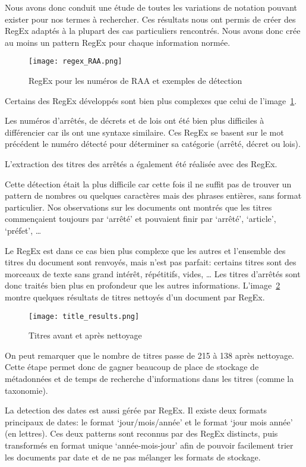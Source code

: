 Nous avons donc conduit une étude de toutes les variations de notation pouvant exister pour nos termes à rechercher.
Ces résultats nous ont permis de créer des RegEx adaptés à la plupart des cas particuliers rencontrés.
Nous avons donc crée au moins un pattern RegEx pour chaque information normée.

\begin{figure}[h!]
  \centering
  \texttt{[image: regex\_RAA.png]}
	\caption[]{RegEx pour les numéros de RAA et exemples de détection}
	\label{fig:regexRAA}
\end{figure}

Certains des RegEx développés sont bien plus complexes que celui de l'image~\ref{fig:regexRAA}.

Les numéros d'arrêtés, de décrets et de lois ont été bien plus difficiles à différencier car ils ont une syntaxe similaire.
Ces RegEx se basent sur le mot précédent le numéro détecté pour déterminer sa catégorie (arrêté, décret ou lois).


L'extraction des titres des arrêtés a également été réalisée avec des RegEx.

Cette détection était la plus difficile car cette fois il ne suffit pas de trouver un pattern de nombres ou quelques caractères mais des phrases entières, sans format particulier.
Nos observations sur les documents ont montrés que les titres commençaient toujours par `arrêté' et pouvaient finir par `arrêté', `article', `préfet', \ldots

Le RegEx est dans ce cas bien plus complexe que les autres et l'ensemble des titres du document sont renvoyés, mais n'est pas parfait: certains titres sont des morceaux de texte sans grand intérêt, répétitifs, vides, \ldots
Les titres d'arrêtés sont donc traités bien plus en profondeur que les autres informations.
L'image~\ref{fig:regexTitles} montre quelques résultats de titres nettoyés d'un document par RegEx.

\begin{figure}[h!]
  \centering
  \texttt{[image: title\_results.png]}
	\caption[]{Titres avant et après nettoyage}
	\label{fig:regexTitles}
\end{figure}

On peut remarquer que le nombre de titres passe de 215 à 138 après nettoyage.
Cette étape permet donc de gagner beaucoup de place de stockage de métadonnées et de temps de recherche d'informations dans les titres (comme la taxonomie).


La detection des dates est aussi gérée par RegEx.
Il existe deux formats principaux de dates: le format `jour/mois/année' et le format `jour mois année' (en lettres).
Ces deux patterns sont reconnus par des RegEx distincts, puis transformés en format unique `année-mois-jour' afin de pouvoir facilement trier les documents par date et de ne pas mélanger les formats de stockage.

